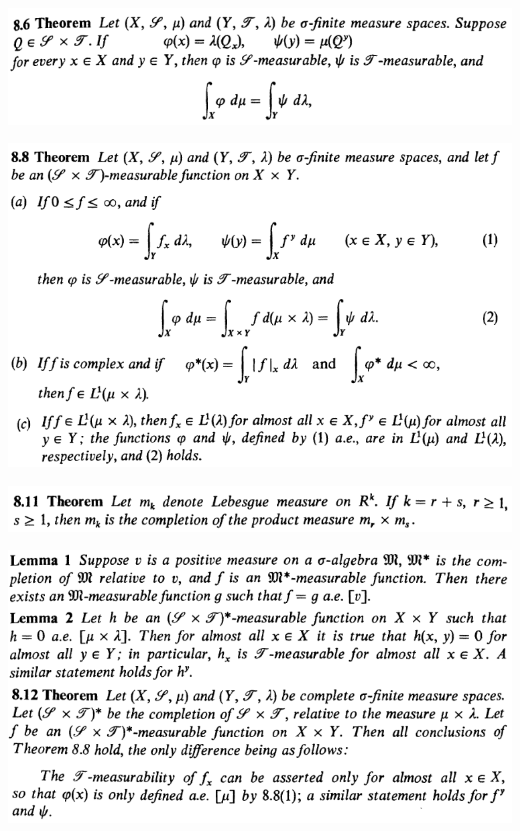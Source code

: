 \documentclass[12pt]{article}
\begin{document}
		\begin{center}
		\includegraphics{8ponto6}
		\end{center}

		\begin{center}
		\includegraphics{8ponto8}
		\end{center}

		\begin{center}
		\includegraphics{8ponto11}
		\end{center}

		\begin{center}
		\includegraphics{8ponto12}
		\end{center}
\end{document}
